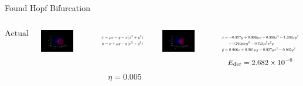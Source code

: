 \documentclass[aspectratio=169]{beamer}
\begin{document}
\begin{frame}{Found Hopf Bifurcation}
	\begin{columns}
		\[ \text{Actual} \]
		\begin{center}
			\includegraphics[width=0.7\textwidth, trim = {4cm, 2cm, 4cm, 2.5cm}, clip]{hopf_normal_actual.pdf}
		\end{center}
		\begin{equation*}
			\resizebox{!}{1.2em}{$
			\begin{aligned}
			\dot x &= \mu x - y - x(x^2 + y^2) \\
			\dot y &= x + \mu y - y(x^2 + y^2) \\
			&\phantom{+ 0.769\mu xy^2 -0.723 \mu^2 x^2y} 
			\end{aligned}
			$}
		\end{equation*}
		\[\text{\small $\phantom{E_\text{der} = 0.00136}$}\]
		\[ \eta = 0.005 \]
		\begin{center}
			\includegraphics[width=0.7\textwidth, trim = {4cm, 2cm, 4cm, 2.5cm}, clip]{found_hopf_bifurcation_0005.pdf}
		\end{center}
		\begin{equation*}
			\resizebox{!}{1.2em}{$
			\begin{aligned}
				\dot x &= -0.957y + 0.908\mu x -0.888x^3 -1.303xy^2 \\
				&\quad  + 0.769\mu xy^2 -0.723 \mu^2 x^2y \\ 
				\dot y &= 0.966x + 0.961\mu y -0.927yx^2 - 0.962y^3
			\end{aligned}
			$}
		\end{equation*}
		\[\text{\small $E_\text{der} = 2.682 \times 10^{-6}$}\]
	\end{columns}
\end{frame}
\end{document}
